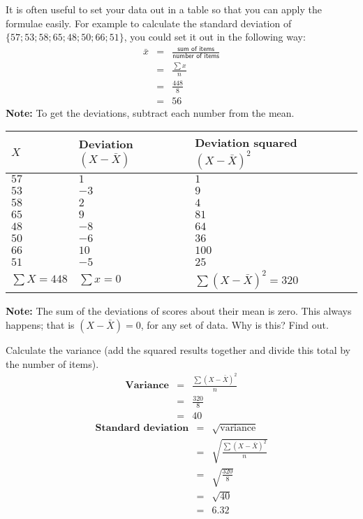 It is often useful to set your data out in a table so that you can apply the formulae easily. For example to calculate the standard deviation of $\{57; 53; 58; 65; 48; 50; 66; 51\}$, you could set it out in the following way: \newline
\begin{eqnarray*}
\bar{x} & = & \frac{\textsf{sum of items}}{\textsf{number of items}} \\
&=& \frac{\sum {x}}{n} \\
&=& \frac{448}{8} \\
&=& 56
\end{eqnarray*}
\textbf{Note:} To get the deviations, subtract each number from the mean.
\begin{center}
\begin{tabular}{|l|l|l|}
\hline
\textbf{$X$} & \textbf{Deviation $(X - \bar{X})$} & \textbf{Deviation squared $(X - \bar{X})^2$} \bigstrut \\
\hline
$57$ & $1$ & $1$ \\
$53$ & $-3$ & $9$ \\
$58$ & $2$ & $4$ \\
$65$ & $9$ & $81$ \\
$48$ & $-8$ & $64$ \\
$50$ & $-6$ & $36$ \\
$66$ & $10$ & $100$ \\
$51$ & $-5$ & $25$ \\
\hline
$\sum{X} = 448$ & $\sum{x} = 0$ & $\sum{(X  - \bar{X})^2} = 320$ \bigstrut \\
\hline
\end{tabular}
\end{center}
\textbf{Note:} The sum of the deviations of scores about their mean is zero. This always happens; that is $(X - \bar{X}) = 0$, for any set of data. Why is this? Find out. \newline

Calculate the variance (add the squared results together and divide this total by the number of items).
\begin{eqnarray*}
\textbf{Variance} & = & \frac{\sum{(X - \bar{X})^2}}{n} \\
&=& \frac{320}{8} \\
&=& 40
\end{eqnarray*}
\begin{eqnarray*}
\textbf{Standard deviation} & = & \sqrt{\mbox{variance}} \\
&=& \sqrt{\frac{\sum{(X - \bar{X})^2}}{n}} \\
&=& \sqrt{\frac{320}{8}} \\
&=& \sqrt{40} \\
&=& 6.32 \\
\end{eqnarray*}


